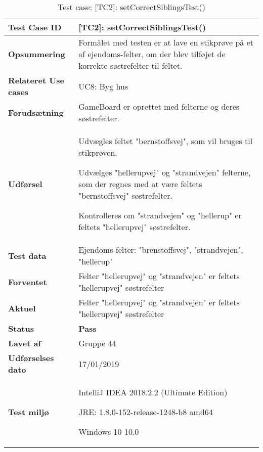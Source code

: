\documentclass[class=article, crop=false]{standalone}
\makeatletter
\let\savespace\@minipagetrue
\makeatother
\begin{document}
    \begin{table}[H]
        \caption{Test case: [TC2]: setCorrectSiblingsTest()}
        \begin{tabularx}{\textwidth}{|l|X|}
            \hline
            \textbf{Test Case ID }       & \textbf{[TC2]: setCorrectSiblingsTest()}   \\ \hline
            \textbf{Opsummering}         & Formålet med testen er at lave en stikprøve på et af ejendoms-felter, om der blev tilføjet de korrekte søstrefelter til feltet.  \\ \hline
            \textbf{Relateret Use cases}     & UC8: Byg hus \\ \hline
            \textbf{Forudsætning}& GameBoard er oprettet med felterne og deres søstrefelter.\\ \hline
            \textbf{Udførsel}            & \begin{tabenum}
                                               \item Udvægles feltet "bernstoffsvej", som vil bruges til stikprøven.
                                               \item Udvælges "hellerupvej" og "strandvejen" felterne, som der regnes med at være feltets "bernstoffsvej" søstrefelter.
                                               \item Kontrolleres om "strandvejen" og "hellerup" er feltets "hellerupvej" søstrefelter.
            \end{tabenum} \\ \hline
            \textbf{Test data}           &  Ejendoms-felter: "brenstoffsvej", "strandvejen", "hellerup" \\ \hline
            \textbf{Forventet} & Felter "hellerupvej" og "strandvejen" er feltets "hellerupvej" søstrefelter\\    \hline
            \textbf{Aktuel} & Felter "hellerupvej" og "strandvejen" er feltets "hellerupvej" søstrefelter  \\ \hline
            \textbf{Status} & \textbf{Pass} \\ \hline
            \textbf{Lavet af} & Gruppe 44\\ \hline
            \textbf{Udførselses dato}  & 17/01/2019\\ \hline
            \textbf{Test miljø}  &  \savespace \begin{compactitem}
                                                   \item IntelliJ IDEA 2018.2.2 (Ultimate Edition)
                                                   \item JRE: 1.8.0-152-release-1248-b8 amd64
                                                   \item Windows 10 10.0
            \end{compactitem} \\ \hline
        \end{tabularx}
    \end{table}
\end{document}
